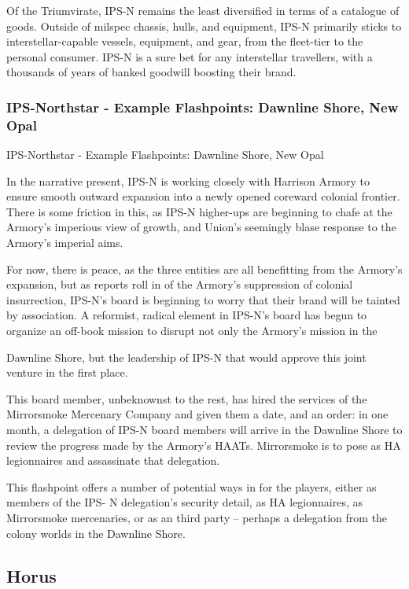 Of the Triumvirate, IPS-N remains the least diversified in terms of a catalogue of goods. Outside
of milspec chassis, hulls, and equipment, IPS-N primarily sticks to interstellar-capable vessels,
equipment, and gear, from the fleet-tier to the personal consumer. IPS-N is a sure bet for any
interstellar travellers, with a thousands of years of banked goodwill boosting their brand.

\subsubsection{IPS-Northstar - Example Flashpoints: Dawnline Shore, New Opal  }
IPS-Northstar - Example Flashpoints: Dawnline Shore, New Opal

In the narrative present, IPS-N is working closely with Harrison Armory to ensure smooth
outward expansion into a newly opened coreward colonial frontier. There is some friction in this,
as IPS-N higher-ups are beginning to chafe at the Armory’s imperious view of growth, and
Union’s seemingly blase response to the Armory’s imperial aims.


For now, there is peace, as the three entities are all benefitting from the Armory’s expansion, but
as reports roll in of the Armory’s suppression of colonial insurrection, IPS-N’s board is beginning
to worry that their brand will be tainted by association. A reformist, radical element in IPS-N’s
board has begun to organize an off-book mission to disrupt not only the Armory’s mission in the




Dawnline Shore, but the leadership of IPS-N that would approve this joint venture in the first
place.


This board member, unbeknownst to the rest, has hired the services of the Mirrorsmoke
Mercenary Company and given them a date, and an order: in one month, a delegation of IPS-N
board members will arrive in the Dawnline Shore to review the progress made by the Armory’s
HAATs. Mirrorsmoke is to pose as HA legionnaires and assassinate that delegation.


This flashpoint offers a number of potential ways in for the players, either as members of the IPS-
N delegation’s security detail, as HA legionnaires, as Mirrorsmoke mercenaries, or as an third
party -- perhaps a delegation from the colony worlds in the Dawnline Shore.


\subsection{Horus}


